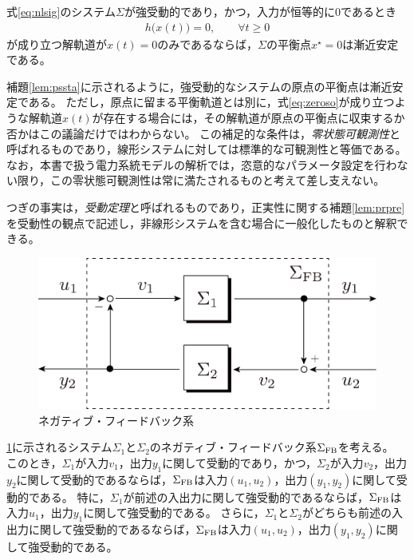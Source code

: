 \documentclass[tombow,dvipdfmx]{corona-a5-1.1}
\begin{document}
\begin{補題}[強受動的なシステムの漸近安定性]\label{lem:pssta}
式\ref{eq:nlsig}のシステム$\Sigma$が強受動的であり，かつ，入力が恒等的に0であるとき
\begin{align}\label{eq:zeroso}
h\bigl(
x(t)
\bigr)=0,\qquad
\forall t\geq 0
\end{align}
が成り立つ解軌道が$x(t)=0$のみであるならば，$\Sigma$の平衡点$x^{\star}=0$は漸近安定である。
\end{補題}

\begin{証明}
\end{証明}

補題\ref{lem:pssta}に示されるように，強受動的なシステムの原点の平衡点は漸近安定である。
ただし，原点に留まる平衡軌道とは別に，式\ref{eq:zeroso}が成り立つような解軌道$x(t)$が存在する場合には，その解軌道が原点の平衡点に収束するか否かはこの議論だけではわからない。
この補足的な条件は，\emph{零状態可観測性}と呼ばれるものであり，線形システムに対しては標準的な可観測性と等価である。
なお，本書で扱う電力系統モデルの解析では，恣意的なパラメータ設定を行わない限り，この零状態可観測性は常に満たされるものと考えて差し支えない。


つぎの事実は，\emph{受動定理}と呼ばれるものであり，正実性に関する補題\ref{lem:prpre}を受動性の観点で記述し，非線形システムを含む場合に一般化したものと解釈できる。

\begin{figure}[t]
  \centering
  \includegraphics[width = .50\linewidth]{figs/fbnlin}
  \caption{ネガティブ・フィードバック系}
  \label{fig:stasig12}
\end{figure}

\begin{定理}[受動定理]\label{thm:psthm}
\ref{fig:stasig12}に示されるシステム$\Sigma_1$と$\Sigma_2$のネガティブ・フィードバック系$\Sigma_{\rm FB}$を考える。
このとき，$\Sigma_1$が入力$v_1$，出力$y_1$に関して受動的であり，かつ，$\Sigma_2$が入力$v_2$，出力$y_2$に関して受動的であるならば，$\Sigma_{\rm FB}$は入力$(u_1,u_2)$，出力$(y_1,y_2)$に関して受動的である。
特に，$\Sigma_1$が前述の入出力に関して強受動的であるならば，$\Sigma_{\rm FB}$は入力$u_1$，出力$y_1$に関して強受動的である。
さらに，$\Sigma_1$と$\Sigma_2$がどちらも前述の入出力に関して強受動的であるならば，$\Sigma_{\rm FB}$は入力$(u_1,u_2)$，出力$(y_1,y_2)$に関して強受動的である。
\end{定理}
\end{document}
